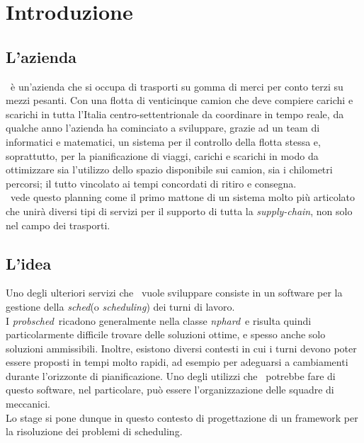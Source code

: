 
\chapter{Introduzione}
\label{cap:introduzione}


\section{L'azienda}

\TS\ è un'azienda che si occupa di trasporti su gomma di merci per conto terzi su mezzi pesanti. Con una flotta di venticinque camion che deve compiere carichi e scarichi in tutta l'Italia centro-settentrionale da coordinare in tempo reale, da qualche anno l'azienda ha cominciato a sviluppare, grazie ad un team di informatici e matematici, un sistema per il controllo della flotta stessa e, soprattutto, per la pianificazione di viaggi, carichi e scarichi in modo da ottimizzare sia l'utilizzo dello spazio disponibile sui camion, sia i chilometri percorsi; il tutto vincolato ai tempi concordati di ritiro e consegna. \\
\TS\ vede questo planning come il primo mattone di un sistema molto più articolato che unirà diversi tipi di servizi per il supporto di tutta la \emph{\gls{supply-chain}}\glsfirstoccur, non solo nel campo dei trasporti.

\section{L'idea}

Uno degli ulteriori servizi che \TS\ vuole sviluppare consiste in un software per la gestione della \emph{\gls{sched}}\glsfirstoccur (o \textit{scheduling}) dei turni di lavoro. \\ I \emph{\gls{probsched}}\glsfirstoccur\ ricadono generalmente nella classe \emph{\gls{nphard}}\glsfirstoccur\ e risulta quindi particolarmente difficile trovare delle soluzioni ottime, e spesso anche solo soluzioni ammissibili. Inoltre, esistono diversi contesti in cui i turni devono poter essere proposti in tempi molto rapidi, ad esempio per adeguarsi a cambiamenti durante l’orizzonte di pianificazione. Uno degli utilizzi che \TS\ potrebbe fare di questo software, nel particolare, può essere l'organizzazione delle squadre di meccanici. \\
Lo stage si pone dunque in questo contesto di progettazione di un framework per la risoluzione dei problemi di scheduling.

